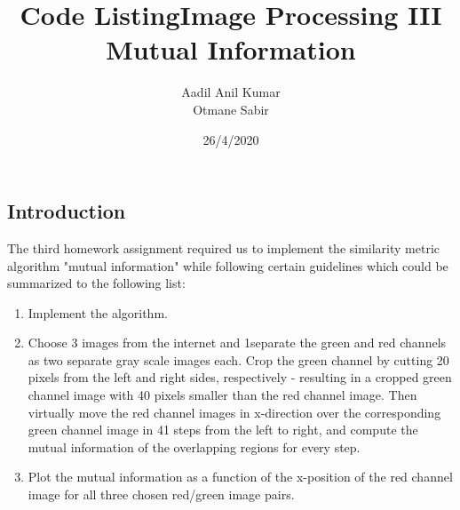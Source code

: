 \documentclass{article}
\title{Code Listing}
\date{ }
\begin{document}
\title{Image Processing III\\
Mutual Information}
\author{Aadil Anil Kumar \\
Otmane Sabir
}
\date{26/4/2020}
\maketitle
\vspace{10mm}
\begin{center}
\section*{Introduction}
\large
The third homework assignment required us to implement the similarity metric algorithm "mutual information" while following certain guidelines which could be summarized to the following list: 
\vspace{7mm}
\begin{enumerate}
    \item Implement the algorithm.
    \item Choose 3 images from the internet and 1separate the green and red channels as two separate gray scale images each. Crop the green channel by cutting 20 pixels from the left and right sides, respectively - resulting in a cropped green channel image with 40 pixels smaller than the red channel image. Then virtually move the red channel images in x-direction over the corresponding green channel image in 41 steps from the left to right, and compute the mutual information of the overlapping regions for every step.
    \item Plot the mutual information as a function of the x-position of the red channel image for all three chosen red/green image pairs.
\end{enumerate}


\end{center}
\newpage

\tableofcontents

\newpage
\end{document}
